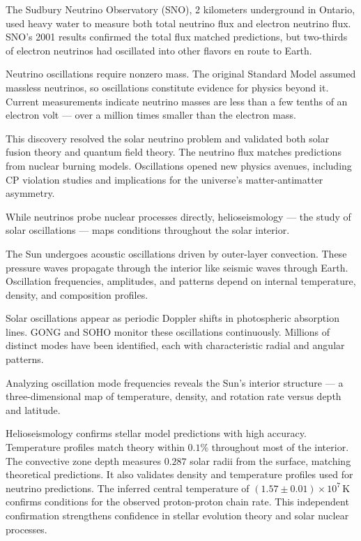 The Sudbury Neutrino Observatory (SNO), 2 kilometers underground in Ontario, used heavy water to measure both total neutrino flux and electron neutrino flux. SNO's 2001 results confirmed the total flux matched predictions, but two-thirds of electron neutrinos had oscillated into other flavors en route to Earth.

Neutrino oscillations require nonzero mass. The original Standard Model assumed massless neutrinos, so oscillations constitute evidence for physics beyond it. Current measurements indicate neutrino masses are less than a few tenths of an electron volt — over a million times smaller than the electron mass.

This discovery resolved the solar neutrino problem and validated both solar fusion theory and quantum field theory. The neutrino flux matches predictions from nuclear burning models. Oscillations opened new physics avenues, including CP violation studies and implications for the universe's matter-antimatter asymmetry.

While neutrinos probe nuclear processes directly, helioseismology — the study of solar oscillations — maps conditions throughout the solar interior.

The Sun undergoes acoustic oscillations driven by outer-layer convection. These pressure waves propagate through the interior like seismic waves through Earth. Oscillation frequencies, amplitudes, and patterns depend on internal temperature, density, and composition profiles.

Solar oscillations appear as periodic Doppler shifts in photospheric absorption lines. GONG and SOHO monitor these oscillations continuously. Millions of distinct modes have been identified, each with characteristic radial and angular patterns.

Analyzing oscillation mode frequencies reveals the Sun's interior structure — a three-dimensional map of temperature, density, and rotation rate versus depth and latitude.

Helioseismology confirms stellar model predictions with high accuracy. Temperature profiles match theory within $0.1\%$ throughout most of the interior. The convective zone depth measures $0.287$ solar radii from the surface, matching theoretical predictions. It also validates density and temperature profiles used for neutrino predictions. The inferred central temperature of $(1.57 \pm 0.01) \times 10^7\,\text{K}$ confirms conditions for the observed proton-proton chain rate. This independent confirmation strengthens confidence in stellar evolution theory and solar nuclear processes.
